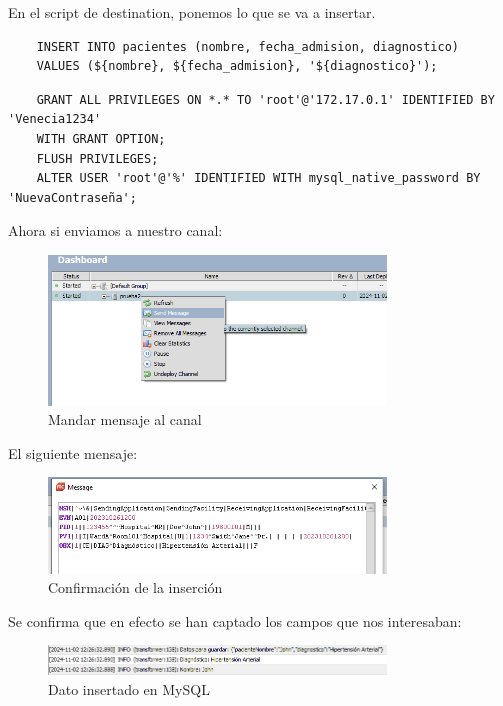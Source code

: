 \documentclass[12pt, a4paper, twoside]{article}
\begin{document}
	En el script de destination, ponemos lo que se va a insertar.
	
	\begin{verbatim}
	INSERT INTO pacientes (nombre, fecha_admision, diagnostico) 
	VALUES (${nombre}, ${fecha_admision}, '${diagnostico}');
	\end{verbatim}
	
	
	
	\begin{verbatim}
	GRANT ALL PRIVILEGES ON *.* TO 'root'@'172.17.0.1' IDENTIFIED BY 'Venecia1234'
	WITH GRANT OPTION;
	FLUSH PRIVILEGES;
	ALTER USER 'root'@'%' IDENTIFIED WITH mysql_native_password BY 'NuevaContraseña';
	\end{verbatim}
	
	Ahora si enviamos a nuestro canal: 
	
	\begin{figure}[h!]
		\centering
		\includegraphics[width=0.8\textwidth]{image/8.png}
		\caption{Mandar mensaje al canal}
		\label{fig:8}
	\end{figure}
	
	El siguiente mensaje:
	
	\begin{figure}[h!]
		\centering
		\includegraphics[width=0.8\textwidth]{image/9.png}
		\caption{Confirmación de la inserción}
		\label{fig:9}
	\end{figure}
	
	Se confirma que en efecto se han captado los campos que nos interesaban: 
	
	\begin{figure}[h!]
		\centering
		\includegraphics[width=0.8\textwidth]{image/11.png}
		\caption{Dato insertado en MySQL}
		\label{fig:11}
	\end{figure}
	
\end{document}
